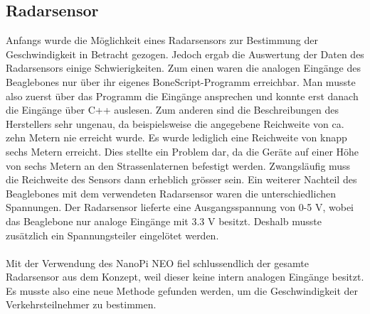 \subsection{Radarsensor}
Anfangs wurde die Möglichkeit eines Radarsensors zur Bestimmung der Geschwindigkeit in Betracht gezogen. Jedoch ergab die Auswertung der Daten des Radarsensors einige Schwierigkeiten. Zum einen waren die analogen Eingänge des Beaglebones nur über ihr eigenes BoneScript-Programm erreichbar. Man musste also zuerst über das Programm die Eingänge ansprechen und konnte erst danach die Eingänge über C++ auslesen. Zum anderen sind die Beschreibungen des Herstellers sehr ungenau, da beispielsweise die angegebene Reichweite von ca. zehn Metern nie erreicht wurde. Es wurde lediglich eine Reichweite von knapp sechs Metern erreicht. Dies stellte ein Problem dar, da die Geräte auf einer Höhe von sechs Metern an den Strassenlaternen befestigt werden. Zwangsläufig muss die Reichweite des Sensors dann erheblich grösser sein. Ein weiterer Nachteil des Beaglebones mit dem verwendeten Radarsensor waren die unterschiedlichen Spannungen. Der Radarsensor lieferte eine Ausgangsspannung von 0-5 V, wobei das Beaglebone nur analoge Eingänge mit 3.3 V besitzt. Deshalb musste zusätzlich ein Spannungsteiler eingelötet werden. \\\\
Mit der Verwendung des NanoPi NEO fiel schlussendlich der gesamte Radarsensor aus dem Konzept, weil dieser keine intern analogen Eingänge besitzt. Es musste also eine neue Methode gefunden werden, um die Geschwindigkeit der Verkehrsteilnehmer zu bestimmen.
